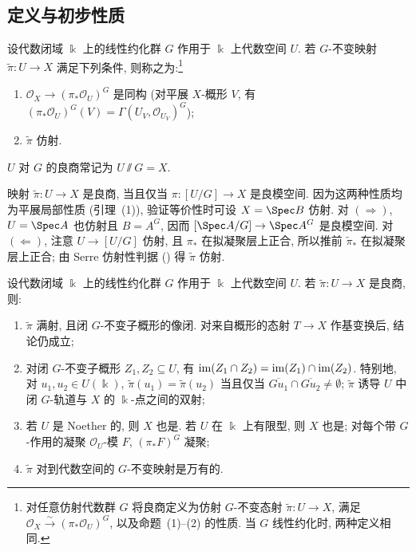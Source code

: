 \subsection{定义与初步性质}\label{src:8.1.1-subsection}
\begin{definition}[良商]\label{src:8.1.1}
设代数闭域 $\Bbbk$ 上的线性约化群 $G$ 作用于 $\Bbbk$ 上代数空间 $U$. 若 $G$-不变映射 $\widetilde\pi:U\to X$ 满足下列条件, 则称之为:\footnote{\cite[定义 1.5]{Ses72} 对任意仿射代数群 $G$ 将良商定义为仿射 $G$-不变态射 $\widetilde\pi:U\to X$, 满足 $\mathcal O_X\xrightarrow{\sim}(\pi_*\mathcal O_U)^G$, 以及命题~(1)--(2) 的性质. 当 $G$ 线性约化时, 两种定义相同.}
\begin{enumerate}[(1)]
\item $\mathcal O_X\to(\pi_*\mathcal O_U)^G$ 是同构 (对平展 $X$-概形 $V$, 有 $(\pi_*\mathcal O_U)^G(V)=\Gamma(U_V,\mathcal O_{U_V})^G$);
\item $\widetilde\pi$ 仿射.
\end{enumerate}
$U$ 对 $G$ 的良商常记为 $U\sslash G=X$.
\end{definition}
\begin{remark}\label{src:8.1.2}
映射 $\widetilde\pi:U\to X$ 是良商, 当且仅当 $\pi:[U/G]\to X$ 是良模空间. 因为这两种性质均为平展局部性质 (引理~(1)), 验证等价性时可设 $X=\Spec B$ 仿射. 对 $(\Rightarrow)$, $U=\Spec A$ 也仿射且 $B=A^G$, 因而 $[\Spec A/G]\to\Spec A^G$ 是良模空间. 对 $(\Leftarrow)$, 注意 $U\to[U/G]$ 仿射, 且 $\pi_*$ 在拟凝聚层上正合, 所以推前 $\widetilde\pi_*$ 在拟凝聚层上正合; 由 Serre 仿射性判据 () 得 $\widetilde\pi$ 仿射.
\end{remark}
\begin{proposition}\label{src:8.1.3}
设代数闭域 $\Bbbk$ 上的线性约化群 $G$ 作用于 $\Bbbk$ 上代数空间 $U$. 若 $\widetilde\pi:U\to X$ 是良商, 则:
\begin{enumerate}[(1)]
\item $\widetilde\pi$ 满射, 且闭 $G$-不变子概形的像闭. 对来自概形的态射 $T\to X$ 作基变换后, 结论仍成立;
\item 对闭 $G$-不变子概形 $Z_1,Z_2\subseteq U$, 有 $\operatorname{im}(Z_1\cap Z_2)=\operatorname{im}(Z_1)\cap\operatorname{im}(Z_2)$. 特别地, 对 $u_1,u_2\in U(\Bbbk)$, $\widetilde\pi(u_1)=\widetilde\pi(u_2)$ 当且仅当 $\overline{Gu_1}\cap\overline{Gu_2}\ne\emptyset$; $\widetilde\pi$ 诱导 $U$ 中闭 $G$-轨道与 $X$ 的 $\Bbbk$-点之间的双射;
\item 若 $U$ 是 Noether 的, 则 $X$ 也是. 若 $U$ 在 $\Bbbk$ 上有限型, 则 $X$ 也是; 对每个带 $G$-作用的凝聚 $\mathcal O_U$-模 $F$, $(\pi_*F)^G$ 凝聚;
\item $\widetilde\pi$ 对到代数空间的 $G$-不变映射是万有的.
\end{enumerate}
\end{proposition}
